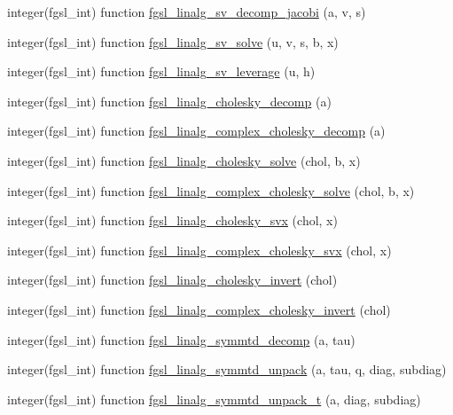 \begin{DoxyCompactItemize}
\item 
integer(fgsl\+\_\+int) function \hyperlink{linalg_8finc_a523fe136a01c78b49531b7e0156b97b6}{fgsl\+\_\+linalg\+\_\+sv\+\_\+decomp\+\_\+jacobi} (a, v, s)
\item 
integer(fgsl\+\_\+int) function \hyperlink{linalg_8finc_a6d96a619a57aeb6a8713babe93a9b71b}{fgsl\+\_\+linalg\+\_\+sv\+\_\+solve} (u, v, s, b, x)
\item 
integer(fgsl\+\_\+int) function \hyperlink{linalg_8finc_a41dd0ef07e31a1e6d109e4d9a0ea8a13}{fgsl\+\_\+linalg\+\_\+sv\+\_\+leverage} (u, h)
\item 
integer(fgsl\+\_\+int) function \hyperlink{linalg_8finc_aa2fa70a59c49090e137f5df8c8c0100f}{fgsl\+\_\+linalg\+\_\+cholesky\+\_\+decomp} (a)
\item 
integer(fgsl\+\_\+int) function \hyperlink{linalg_8finc_a8f9547ecd2fa79bcf02e423c078bb4ea}{fgsl\+\_\+linalg\+\_\+complex\+\_\+cholesky\+\_\+decomp} (a)
\item 
integer(fgsl\+\_\+int) function \hyperlink{linalg_8finc_a7bca2d4f11f9e651c747926af5a5be70}{fgsl\+\_\+linalg\+\_\+cholesky\+\_\+solve} (chol, b, x)
\item 
integer(fgsl\+\_\+int) function \hyperlink{linalg_8finc_a7ff644dd25158aa5e839ccbc63a5d323}{fgsl\+\_\+linalg\+\_\+complex\+\_\+cholesky\+\_\+solve} (chol, b, x)
\item 
integer(fgsl\+\_\+int) function \hyperlink{linalg_8finc_ac949d4b315b2803bf6d98a3b1549321a}{fgsl\+\_\+linalg\+\_\+cholesky\+\_\+svx} (chol, x)
\item 
integer(fgsl\+\_\+int) function \hyperlink{linalg_8finc_a20424291c37db28845ad5b97cbefb32d}{fgsl\+\_\+linalg\+\_\+complex\+\_\+cholesky\+\_\+svx} (chol, x)
\item 
integer(fgsl\+\_\+int) function \hyperlink{linalg_8finc_a0613e58907c2ae3d3527bc6d76db20f9}{fgsl\+\_\+linalg\+\_\+cholesky\+\_\+invert} (chol)
\item 
integer(fgsl\+\_\+int) function \hyperlink{linalg_8finc_ab986997d7b43b9df1c81a62c0117d3da}{fgsl\+\_\+linalg\+\_\+complex\+\_\+cholesky\+\_\+invert} (chol)
\item 
integer(fgsl\+\_\+int) function \hyperlink{linalg_8finc_a529a24d383e0ed224830a3b5a45329b4}{fgsl\+\_\+linalg\+\_\+symmtd\+\_\+decomp} (a, tau)
\item 
integer(fgsl\+\_\+int) function \hyperlink{linalg_8finc_a43c68814765ca38dd4054712c4dde774}{fgsl\+\_\+linalg\+\_\+symmtd\+\_\+unpack} (a, tau, q, diag, subdiag)
\item 
integer(fgsl\+\_\+int) function \hyperlink{linalg_8finc_a4d487701aea9f427ae6482afc63567ee}{fgsl\+\_\+linalg\+\_\+symmtd\+\_\+unpack\+\_\+t} (a, diag, subdiag)

\end{DoxyCompactItemize}
